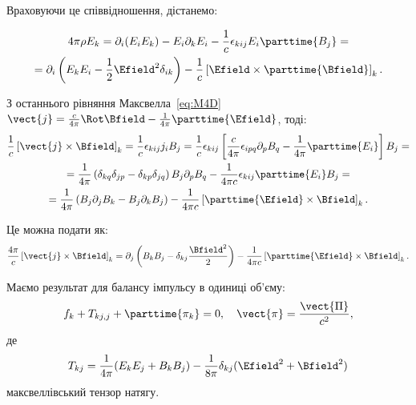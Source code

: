Враховуючи це співвідношення, дістанемо:

\begin{multline*}
	4\pi\rho E_k =  \partial_i(E_iE_k) - E_i \partial_kE_i - \frac1c \epsilon_{kij} E_i \parttime{B_j} = \\
	= \partial_i\left( E_kE_i - \frac12
	\Efield^2\delta_{ik}\right) - \frac1c \left[ \Efield \times \parttime{\Bfield}\right]_k .
\end{multline*}

З останнього рівняння Максвелла~\eqref{eq:M4D} $\vect{j} = \frac{c}{4\pi} \Rot\Bfield - \frac1{4\pi}
\parttime{\Efield}$, тоді:
\begin{multline*}
	\frac1c \left[ \vect{j}\times\Bfield\right]_k = \frac1c \epsilon_{kij} j_i B_j = \frac1c  \epsilon_{kij} \left[ \frac{c}{4\pi}\epsilon_{ipq}\partial_p B_q -
		\frac1{4\pi}\parttime{E_i}
		\right] B_j = \\
	= \frac1{4\pi} \left( \delta_{kq}\delta_{jp} - \delta_{kp}\delta_{jq} \right) B_j\partial_p B_q - \frac1{4\pi c} \epsilon_{kij}\parttime{E_i} B_j =
	\\
	= \frac1{4\pi} \left( B_j \partial_j B_k - B_j \partial_k B_j \right) - \frac1{4\pi c} \left[ \parttime{\Efield}\times\Bfield\right]_k.
\end{multline*}

Це можна подати як:
\begin{equation*}
	\frac{4\pi}{c} \left[ \vect{j}\times\Bfield\right]_k = \partial_j \left( B_kB_j - \delta_{kj} \frac{\Bfield^2}{2}\right) - \frac1{4\pi c} \left[
		\parttime{\Efield}\times\Bfield\right]_k.
\end{equation*}

Маємо результат для балансу імпульсу в одиниці об'єму:
\begin{equation}
	f_k + T_{kj, j}  + \parttime{\pi_k} = 0, \quad \vect{\pi} = \frac{\vect{\Pi}}{c^2},
\end{equation}
де
\begin{equation*}
	T_{kj} = \frac1{4\pi} (E_kE_j + B_kB_j) - \frac1{8\pi}\delta_{kj}(\Efield^2 + \Bfield^2)
\end{equation*}
максвеллівський тензор натягу.

